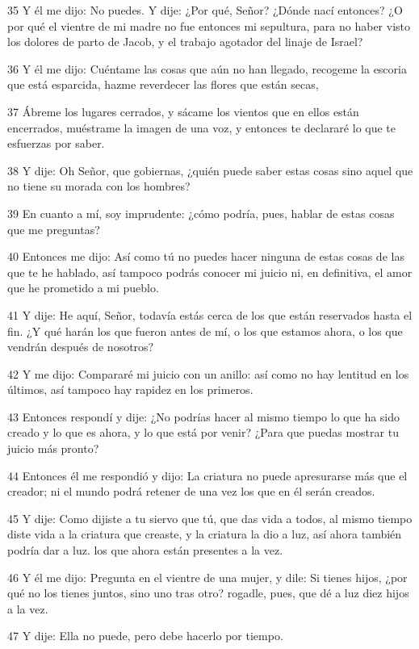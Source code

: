 \par 35 Y él me dijo: No puedes. Y dije: ¿Por qué, Señor? ¿Dónde nací entonces? ¿O por qué el vientre de mi madre no fue entonces mi sepultura, para no haber visto los dolores de parto de Jacob, y el trabajo agotador del linaje de Israel?
\par 36 Y él me dijo: Cuéntame las cosas que aún no han llegado, recogeme la escoria que está esparcida, hazme reverdecer las flores que están secas,
\par 37 Ábreme los lugares cerrados, y sácame los vientos que en ellos están encerrados, muéstrame la imagen de una voz, y entonces te declararé lo que te esfuerzas por saber.
\par 38 Y dije: Oh Señor, que gobiernas, ¿quién puede saber estas cosas sino aquel que no tiene su morada con los hombres?
\par 39 En cuanto a mí, soy imprudente: ¿cómo podría, pues, hablar de estas cosas que me preguntas?
\par 40 Entonces me dijo: Así como tú no puedes hacer ninguna de estas cosas de las que te he hablado, así tampoco podrás conocer mi juicio ni, en definitiva, el amor que he prometido a mi pueblo.
\par 41 Y dije: He aquí, Señor, todavía estás cerca de los que están reservados hasta el fin. ¿Y qué harán los que fueron antes de mí, o los que estamos ahora, o los que vendrán después de nosotros?
\par 42 Y me dijo: Compararé mi juicio con un anillo: así como no hay lentitud en los últimos, así tampoco hay rapidez en los primeros.
\par 43 Entonces respondí y dije: ¿No podrías hacer al mismo tiempo lo que ha sido creado y lo que es ahora, y lo que está por venir? ¿Para que puedas mostrar tu juicio más pronto?
\par 44 Entonces él me respondió y dijo: La criatura no puede apresurarse más que el creador; ni el mundo podrá retener de una vez los que en él serán creados.
\par 45 Y dije: Como dijiste a tu siervo que tú, que das vida a todos, al mismo tiempo diste vida a la criatura que creaste, y la criatura la dio a luz, así ahora también podría dar a luz. los que ahora están presentes a la vez.
\par 46 Y él me dijo: Pregunta en el vientre de una mujer, y dile: Si tienes hijos, ¿por qué no los tienes juntos, sino uno tras otro? rogadle, pues, que dé a luz diez hijos a la vez.
\par 47 Y dije: Ella no puede, pero debe hacerlo por tiempo.
